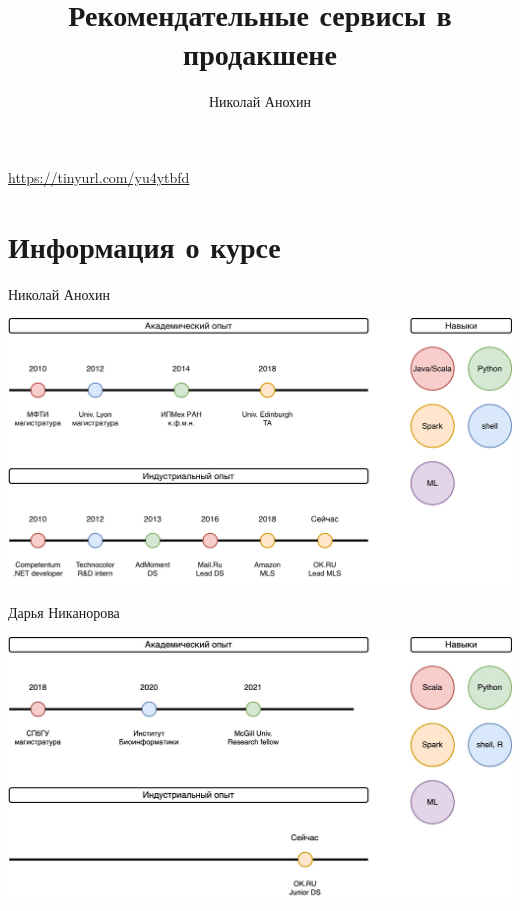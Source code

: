 \documentclass[11pt,aspectratio=169,handout]{beamer}
\author{Николай Анохин}
\title{Рекомендательные сервисы в продакшене}
\begin{document}
{

\begin{frame}
\titlepage
\end{frame}


}

\begin{frame}{}

\begin{tcolorbox}[colback=info!5,colframe=info!80,title=Входной опрос]
\url{https://tinyurl.com/yu4ytbfd}
\end{tcolorbox}

\end{frame}

\section{Информация о курсе}

\begin{frame}{Николай Анохин}

\begin{center}
\includegraphics[scale=0.23]{images/about-me.png}
\end{center}

\end{frame}

\begin{frame}{Дарья Никанорова}

\begin{center}
\includegraphics[scale=0.23]{images/about-me-dasha.jpg}
\end{center}

\end{frame}
\end{document}
